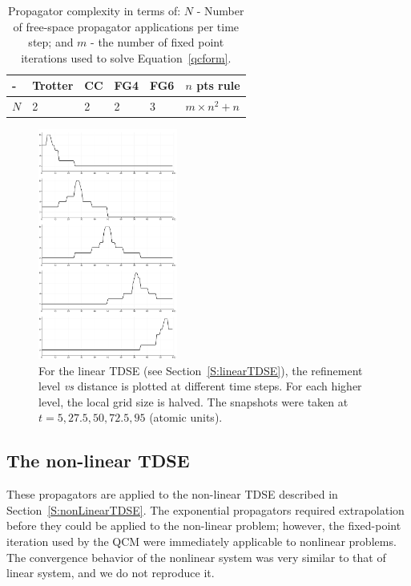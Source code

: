 \documentclass[review,letterpaper]{elsarticle}
\begin{document}
\begin{table}[htbp]
\caption{
 Propagator complexity in terms of:
 $N$ - Number of free-space propagator applications per time step; and $m$ -
 the number of fixed point iterations used to solve Equation~\eqref{qcform}.
 }
\label{seq:refTable0}
\begin{supertabular}{|m{0.78in}|m{0.5in}|m{0.5in}|m{0.5in}|m{0.5in}|m{0.6in}|}
\hline
- & Trotter & CC & FG4 & FG6 &  $n$ pts rule \\
 \hline
$N$ & 2 & 2 & 2 & 3 & $m \times n^2+n$\\
\hline
\end{supertabular}
\end{table}


\begin{figure}[htbp]
\centering
\includegraphics[width=1.8in]{depth.jpg}
\caption{For the linear TDSE (see Section~\ref{S:linearTDSE}),
the refinement level \emph{vs} distance is plotted at different time steps.
For each higher level, the local grid size is halved. The snapshots were taken at $t=5,27.5,50,72.5,95$ (atomic units).}
\label{seq:refFig.11}
\end{figure}



\subsection{The non-linear TDSE}
These propagators are applied to the non-linear TDSE described in Section~\ref{S:nonLinearTDSE}.
The exponential propagators required extrapolation before they could be applied
to the non-linear problem; however, the fixed-point iteration used by the QCM were
immediately applicable to nonlinear problems.
The convergence behavior of the nonlinear system was very similar to that of linear system, and
we do not reproduce it.
\end{document}
